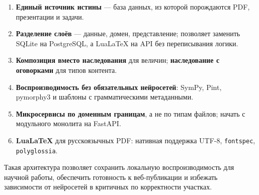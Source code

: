 \documentclass[12pt,a4paper]{article}
\newcommand{\code}[1]{\texttt{#1}}
\begin{document}
\begin{enumerate}
    \item \textbf{Единый источник истины} --- база данных, из которой
          порождаются PDF, презентации и задачи.
    \item \textbf{Разделение слоёв} --- данные, домен, представление;
          позволяет заменить SQLite на PostgreSQL, а LuaLaTeX на API
          без переписывания логики.
    \item \textbf{Композиция вместо наследования} для величин;
          \textbf{наследование с оговорками} для типов контента.
    \item \textbf{Воспроизводимость без обязательных нейросетей}:
          SymPy, Pint, pymorphy3 и шаблоны с грамматическими
          метаданными.
    \item \textbf{Микросервисы по доменным границам}, а не по типам
          файлов; начать с модульного монолита на FastAPI.
    \item \textbf{LuaLaTeX} для русскоязычных PDF: нативная поддержка
          UTF-8, \code{fontspec}, \code{polyglossia}.
\end{enumerate}

\noindent
Такая архитектура позволяет сохранить локальную воспроизводимость
для научной работы, обеспечить готовность к веб-публикации и
избежать зависимости от нейросетей в критичных по корректности
участках.
\end{document}

